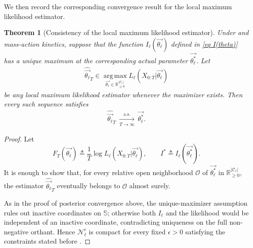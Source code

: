 \documentclass[pdflatex,sn-mathphys-num]{sn-jnl}%
\theoremstyle{thmstyleone}%
\newtheorem{theorem}{Theorem}%
\theoremstyle{thmstyletwo}%
\theoremstyle{thmstylethree}%
\begin{document}
\begin{appendices}
We then record the corresponding convergence result for the local maximum likelihood estimator.

\begin{theorem}[Consistency of the local maximum likelihood estimator]\label{thm convergence of local MLE}
    Under  and mass-action kinetics, suppose that the function $I_\ell\left(\overrightarrow{\theta_\ell}\right)$ defined in \eqref{eq I(theta)} has a unique maximum at the corresponding actual parameter $\overrightarrow{\theta^*_\ell}$.
    Let
    \begin{align*}
        \widehat{\overrightarrow{\theta_\ell}}_T
        \in
        \operatorname*{arg\,max}_{\overrightarrow{\theta_\ell}\in\mathbb R_{\geq0}^{|\mathcal C_\ell|}}
        L_\ell\left(X_{0:T}\big|\overrightarrow{\theta_\ell}\right)
    \end{align*}
    be any local maximum likelihood estimator whenever the maximizer exists.
    Then every such sequence satisfies
    \begin{align*}
        \widehat{\overrightarrow{\theta_\ell}}_T
        ~\xrightarrow[T\to\infty]{\mathrm{a.s.}}~
        \overrightarrow{\theta^*_\ell}.
    \end{align*}
\end{theorem}

\begin{proof}
    Let
    \[
        F_T\left(\overrightarrow{\theta_\ell}\right)
        \triangleq
        \frac{1}{T}\log L_\ell\left(X_{0:T}\big|\overrightarrow{\theta_\ell}\right),
        \qquad
        I^*
        \triangleq
        I_\ell\left(\overrightarrow{\theta^*_\ell}\right).
    \]
    It is enough to show that, for every relative open neighborhood $\mathcal O$ of $\overrightarrow{\theta^*_\ell}$ in $\mathbb R_{\geq0}^{|\mathcal C_\ell|}$, the estimator $\widehat{\overrightarrow{\theta_\ell}}_T$ eventually belongs to $\mathcal O$ almost surely.

    As in the proof of posterior convergence above, the unique-maximizer assumption rules out inactive coordinates on $\mathbb S$; otherwise both $I_\ell$ and the likelihood would be independent of an inactive coordinate, contradicting uniqueness on the full non-negative orthant.
    Hence $\mathcal N_\ell^\epsilon$ is compact for every fixed $\epsilon>0$ satisfying the constraints stated before .


\end{proof}
\end{appendices}
\end{document}
